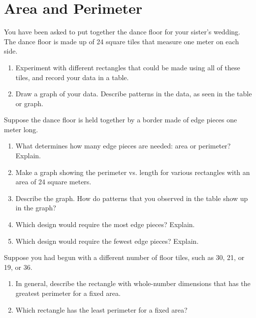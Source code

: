 \newpage

\section{Area and Perimeter}


\begin{prob} You have been asked to put together the dance floor for your sister's wedding.  The dance floor is made up of 24 square tiles that measure one meter on each side. 
\begin{enumerate}
\item Experiment with different rectangles that could be made using all of these tiles, and record your data in a table.  
\item Draw a graph of your data.  Describe patterns in the data, as seen in the table or graph.  
\end{enumerate}
\end{prob}

\begin{prob} Suppose the dance floor is held together by a border made of edge pieces one meter long.  
\begin{enumerate}
\item What determines how many edge pieces are needed: area or perimeter?  Explain. 
\item Make a graph showing the perimeter vs. length for various rectangles with an area of 24 square meters.  
\item Describe the graph.  How do patterns that you observed in the table show up in the graph?  
\item Which design would require the most edge pieces?  Explain.  
\item Which design would require the fewest edge pieces?  Explain.
\end{enumerate}
\end{prob}

\begin{prob}
Suppose you had begun with a different number of floor tiles, such as 30, 21, or 19, or 36.  
\begin{enumerate}
\item In general, describe the rectangle with whole-number dimensions that has the greatest perimeter for a fixed area.  
\item Which rectangle has the least perimeter for a fixed area?
\end{enumerate}
\end{prob}

